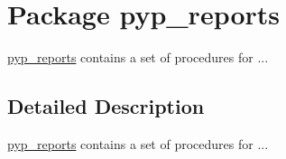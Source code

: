 \hypertarget{namespacepyp__reports}{
\section{Package pyp\_\-reports}
\label{namespacepyp__reports}
}


\hyperlink{namespacepyp__reports}{pyp\_\-reports} contains a set of procedures for ...  




\subsection{Detailed Description}
\hyperlink{namespacepyp__reports}{pyp\_\-reports} contains a set of procedures for ... 